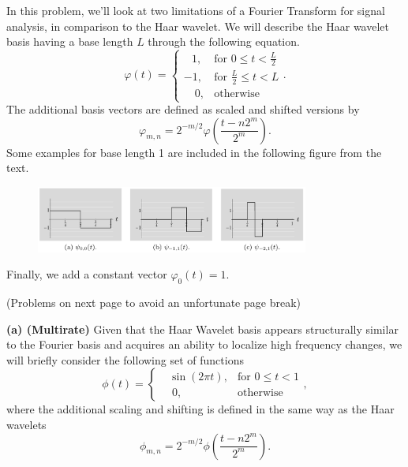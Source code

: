 \documentclass[12pt]{article}
\newcommand{\0}{\mathbf{0}}
\begin{document}
In this problem, we'll look at two limitations of a Fourier Transform for signal analysis, in comparison to the Haar wavelet.
We will describe the Haar wavelet basis having a base length $L$ through the following equation.
\begin{equation}
\varphi (t) = \begin{cases}
\;\;\, 1, &\text{for } 0 \leq t < \frac{L}{2} \\
-1,  &\text{for } \frac{L}{2} \leq t < L \\
\quad 0,  &\text{otherwise}
\end{cases}.
\end{equation}
The additional basis vectors are defined as scaled and shifted versions by 
\begin{equation}
\varphi_{m,n} = 2^{-m/2} \varphi\left(\frac{t - n2^m}{2^m}\right).
\end{equation}
Some examples for base length 1 are included in the following figure from the text.
\begin{figure}[h]
\centering
\includegraphics[width=0.8\textwidth]{haar.png}
\end{figure}

Finally, we add a constant vector $\varphi_0(t) = 1$.

(Problems on next page to avoid an unfortunate page break)

\vspace{3mm}
\pagebreak
\textbf{(a) (Multirate)} Given that the Haar Wavelet basis appears structurally similar to the Fourier basis and acquires an ability to localize high frequency changes, we will briefly consider the following set of functions
\begin{equation}
\phi (t) = \begin{cases}
\;\;\, \sin(2 \pi t), &\text{for } 0 \leq t < 1 \\
\quad 0,  &\text{otherwise}
\end{cases},
\end{equation}
where the additional scaling and shifting is defined in the same way as the Haar wavelets
\begin{equation}
\phi_{m,n} = 2^{-m/2} \phi\left(\frac{t - n2^m}{2^m}\right).
\end{equation}
\end{document}
